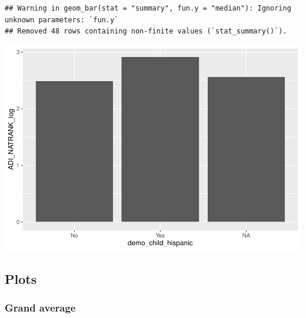 \documentclass[
]{article}
\begin{document}
\begin{verbatim}
## Warning in geom_bar(stat = "summary", fun.y = "median"): Ignoring unknown parameters: `fun.y`
## Removed 48 rows containing non-finite values (`stat_summary()`).
\end{verbatim}

\includegraphics{do01_BUDS_files/figure-latex/unnamed-chunk-8-4.pdf}

\hypertarget{plots}{%
\subsection{Plots}\label{plots}}

\hypertarget{grand-average}{%
\subsubsection{Grand average}\label{grand-average}}
\end{document}
